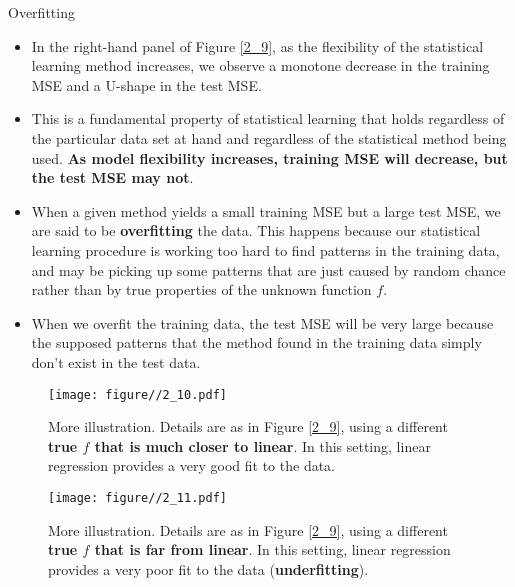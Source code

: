 \documentclass[10pt,a4paper]{beamer}
\begin{document}
\begin{frame}{Overfitting}

\begin{itemize}\small
  \item In the right-hand panel of Figure \ref{2_9}, as the flexibility of the statistical
learning method increases, we observe a monotone decrease in the training MSE and a U-shape in the test MSE.
  \item This is a fundamental property of
statistical learning that holds regardless of the particular data set at hand
and regardless of the statistical method being used. \textbf{As model flexibility
increases, training MSE will decrease, but the test MSE may not}.
\item When a given method yields a small training MSE but a large test MSE, we are
said to be \textbf{overfitting} the data. This happens because our statistical learning
procedure is working too hard to find patterns in the training data, and
may be picking up some patterns that are just caused by random chance
rather than by true properties of the unknown function $f$.
\item When we overfit the training data, the test MSE will be very large because the supposed
patterns that the method found in the training data simply don't exist
in the test data.
\end{itemize}

\end{frame}


\begin{frame}{}

\begin{figure}
  \centering
  \texttt{[image: figure//2\_10.pdf]}\\
  \caption{More illustration. Details are as in Figure \ref{2_9}, using a different \textbf{true $f$ that is
much closer to linear}. In this setting, linear regression provides a very good fit to
the data.}\label{}
\end{figure}


\end{frame}



\begin{frame}{}

\begin{figure}
  \centering
  \texttt{[image: figure//2\_11.pdf]}\\
  \caption{More illustration. Details are as in Figure \ref{2_9}, using a different \textbf{true $f$ that is far from
linear}. In this setting, linear regression provides a very poor fit to the data (\textbf{underfitting}).}\label{2_11}
\end{figure}


\end{frame}
\end{document}
